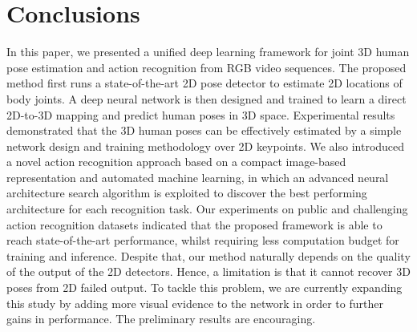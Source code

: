 \documentclass{bmvc2k}
\begin{document}
\section{Conclusions \\[-0.2cm]} \label{sect:5}
In this paper, we presented a unified deep learning framework for joint 3D human pose estimation and action recognition from RGB video sequences. The proposed method first runs a state-of-the-art 2D pose detector to estimate 2D locations of body joints. A deep neural network is then designed and trained to learn a direct 2D-to-3D mapping and predict human poses in 3D space. Experimental results demonstrated that the 3D human poses can be effectively estimated by a simple network design and training methodology over 2D keypoints. We also introduced a novel action recognition approach based on a compact image-based representation and automated machine learning, in which an advanced neural architecture search algorithm is exploited to discover the best performing architecture for each recognition task. Our experiments on public and challenging action recognition datasets indicated that the proposed framework is able to reach state-of-the-art performance, whilst requiring less computation budget for training and inference. Despite that, our method naturally depends on the quality of the output of the 2D detectors. Hence, a limitation is that it cannot recover 3D poses from 2D failed output. To tackle this problem, we are currently expanding this study by adding more visual evidence to the network in order to further gains in performance. The preliminary results are encouraging. 

\end{document}
